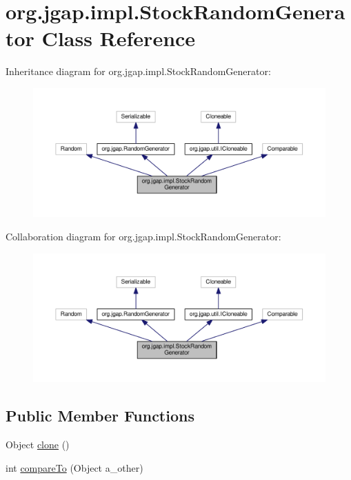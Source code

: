 \hypertarget{classorg_1_1jgap_1_1impl_1_1_stock_random_generator}{\section{org.\-jgap.\-impl.\-Stock\-Random\-Generator Class Reference}
\label{classorg_1_1jgap_1_1impl_1_1_stock_random_generator}
}


Inheritance diagram for org.\-jgap.\-impl.\-Stock\-Random\-Generator\-:
\nopagebreak
\begin{figure}[H]
\begin{center}
\leavevmode
\includegraphics[width=350pt]{classorg_1_1jgap_1_1impl_1_1_stock_random_generator__inherit__graph}
\end{center}
\end{figure}


Collaboration diagram for org.\-jgap.\-impl.\-Stock\-Random\-Generator\-:
\nopagebreak
\begin{figure}[H]
\begin{center}
\leavevmode
\includegraphics[width=350pt]{classorg_1_1jgap_1_1impl_1_1_stock_random_generator__coll__graph}
\end{center}
\end{figure}
\subsection*{Public Member Functions}
\begin{DoxyCompactItemize}
\item 
Object \hyperlink{classorg_1_1jgap_1_1impl_1_1_stock_random_generator_a7f02a6079d0a9c86ddc2990b8ffc512a}{clone} ()
\item 
int \hyperlink{classorg_1_1jgap_1_1impl_1_1_stock_random_generator_af426e9556e5da5fe99a6ac4fa6a7434a}{compare\-To} (Object a\-\_\-other)
\end{DoxyCompactItemize}
